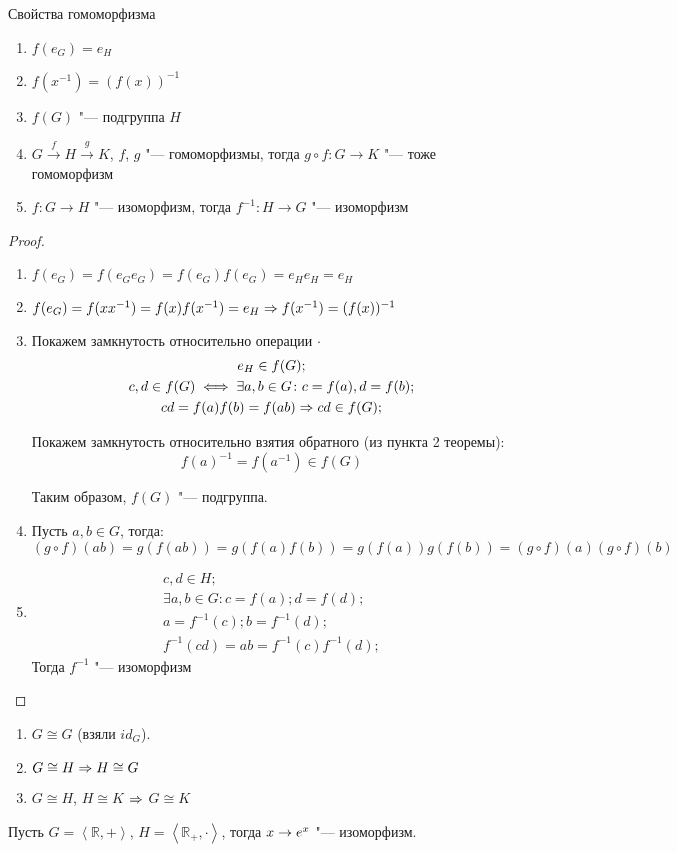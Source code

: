 \begin{theorem}{Свойства гомоморфизма}
	\begin{enumerate}
		\item $f(e_G) = e_H$
		\item $f(x^{-1}) = (f(x))^{-1}$
		\item $f(G)$ "--- подгруппа $H$
		\item $G \xrightarrow{f} H \xrightarrow{g} K$, $f$, $g$ "--- гомоморфизмы, тогда $g \circ f: G \to K$ "--- тоже гомоморфизм
		\item $f: G \to H$ "--- изоморфизм, тогда $f^{-1}: H \to G$ "--- изоморфизм
	\end{enumerate}
\end{theorem}
\begin{proof}
	\begin{enumerate}
		\item $f(e_G) = f(e_G e_G) = f(e_G)f(e_G) = e_H e_H = e_H$
		\item $f(e_G) = f(x x^{-1}) = f(x)f(x^{-1}) = e_H \Rightarrow f(x^{-1}) = (f(x))^{-1}$
		\item
		    Покажем замкнутость относительно операции $\cdot$
		    \begin{gather*}
			e_H \in f(G); \\
			c, d \in f(G) \iff \exists a, b \in G \colon c = f(a), d = f(b); \\
			cd = f(a)f(b) = f(ab) \Rightarrow cd \in f(G); \\
			\end{gather*}

			Покажем замкнутость относительно взятия обратного (из пункта 2 теоремы):
			\[f(a)^{-1} = f(a^{-1}) \in f(G)\]

			Таким образом, $f(G)$ "--- подгруппа.
		\item Пусть $a, b \in G$, тогда:
			\[(g \circ f)(ab) = g(f(ab)) = g(f(a)f(b)) = g(f(a))g(f(b)) = (g \circ f)(a)(g \circ f)(b)\]
		\item
			\begin{gather*}
			c, d \in H; \\
			\exists a, b \in G\colon c = f(a); d = f(d); \\
			a = f^{-1}(c); b = f^{-1}(d); \\
			f^{-1}(cd) = ab = f^{-1}(c)f^{-1}(d);
			\end{gather*}
			Тогда $f^{-1}$ "--- изоморфизм
	\end{enumerate}   
\end{proof}		

\begin{conseq}
    \begin{enumerate}
    \item  $G \cong G$ (взяли $id_G$).
    \item  $G \cong H \Rightarrow H \cong G$
    \item  $G \cong H$, $H \cong K$ $\Rightarrow$ $G \cong K$
    \end{enumerate}

\end{conseq}

\begin{exmp}
Пусть $G=\left< \mathbb{R}, +\right>$, $H=\left< \mathbb{R}_+, \cdot\right>$, тогда $x \rightarrow e^x$ "--- изоморфизм.
\end{exmp}
